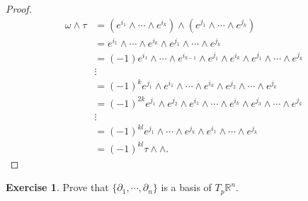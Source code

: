 \documentclass[12pt, psamsfonts]{amsart}
\theoremstyle{definition}
\newtheorem{exer}[thm]{Exercise}
\theoremstyle{remark}
\numberwithin{equation}{section}
\begin{document}
\begin{proof}
  \begin{align*}
    \omega \wedge \tau
      &= (e^{i_1} \wedge \cdots \wedge e^{i_k}) \wedge (e^{j_1} \wedge \cdots \wedge e^{j_k}) \\
      &= e^{i_1} \wedge \cdots \wedge e^{i_k} \wedge e^{j_1} \wedge \cdots \wedge e^{j_k} \\
      &= (-1) e^{i_1} \wedge \cdots \wedge e^{i_{k - 1}} \wedge e^{j_1} \wedge e^{i_k} \wedge e^{j_1} \wedge \cdots \wedge e^{j_k} \\
      &\vdots \\
      &= (-1)^k e^{j_1} \wedge e^{i_1} \wedge \cdots \wedge e^{i_k} \wedge e^{j_2} \wedge \cdots \wedge e^{j_k} \\
      &= (-1)^{2k} e^{j_1} \wedge e^{j_2} \wedge e^{i_1} \wedge \cdots \wedge e^{i_k} \wedge e^{j_3} \wedge \cdots \wedge e^{j_k} \\
      &\vdots \\
      &= (-1)^{kl} e^{j_1} \wedge \cdots \wedge e^{j_k} \wedge e^{i_1} \wedge \cdots \wedge e^{j_k} \\
      &= (-1)^{kl} \tau \wedge \wedge.
  \end{align*}
\end{proof}


\begin{exer}
  Prove that $\{ \partial_1, \cdots, \partial_n \}$ is a basis of $T_p \mathbb{R}^n$.
\end{exer}
\end{document}
